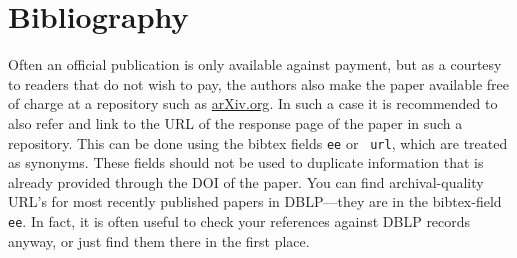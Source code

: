 \documentclass[adraft,copyright,creativecommons]{eptcs}
\begin{document}





\section{Bibliography}

Often an official publication is only available against payment, but
as a courtesy to readers that do not wish to pay, the authors also
make the paper available free of charge at a repository such as
\url{arXiv.org}. In such a case it is recommended to also refer and
link to the URL of the response page of the paper in such a
repository.  This can be done using the bibtex fields {\tt ee} or {\tt
url}, which are treated as synonyms.  These fields should not be used
to duplicate information that is already provided through the DOI of
the paper.
You can find archival-quality URL's for most recently published papers
in DBLP---they are in the bibtex-field {\tt ee}. In fact, it is often
useful to check your references against DBLP records anyway, or just find
them there in the first place.


\nocite{*}


\end{document}
